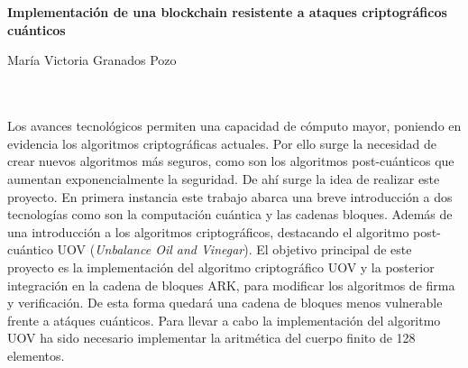 \chapter*{}






\cleardoublepage
\thispagestyle{empty}

\begin{center}
{\large\bfseries Implementación de una blockchain resistente a ataques criptográficos cuánticos}\\
\end{center}
\begin{center}
María Victoria Granados Pozo\\
\end{center}

\\

\vspace{0.7cm}
\\

Los avances tecnológicos permiten una capacidad de cómputo mayor, poniendo en evidencia los algoritmos criptográficas actuales. Por ello surge la necesidad de crear nuevos algoritmos más seguros, como son los algoritmos post-cuánticos que aumentan exponencialmente la seguridad. De ahí surge la idea de realizar este proyecto. En primera instancia este trabajo abarca una  breve introducción a dos tecnologías como son la computación cuántica y las cadenas bloques. Además de una introducción a los algoritmos criptográficos, destacando el algoritmo post-cuántico UOV (\textit{Unbalance Oil and Vinegar}). El objetivo principal de este proyecto es la implementación del algoritmo criptográfico UOV  y la posterior integración en la cadena de bloques ARK, para modificar los algoritmos de firma y verificación. De esta forma quedará una cadena de bloques menos vulnerable frente a atáques cuánticos. Para llevar a cabo la implementación del algoritmo UOV ha sido necesario implementar la aritmética del cuerpo finito de 128 elementos.\\
\cleardoublepage


\thispagestyle{empty}


